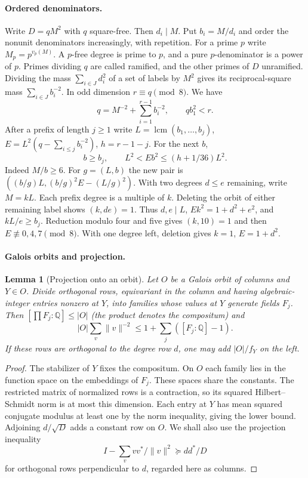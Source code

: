 \documentclass[11pt]{amsart}
\numberwithin{equation}{section}
\newtheorem{lemma}[theorem]{Lemma}
\theoremstyle{definition}
\theoremstyle{plain}
\DeclareMathOperator{\lcm}{lcm}
\newcommand{\QQ}{\mathbb Q}
\begin{document}
\paragraph{Ordered denominators.}
Write $D=qM^2$ with $q$ square-free. Then $d_i\mid M$. Put
$b_i=M/d_i$ and order the nonunit denominators increasingly, with
repetition. For a prime $p$ write $M_p=p^{v_p(M)}$. A $p$-free
degree is prime to $p$, and a pure $p$-denominator is a power of $p$.
Primes dividing $q$ are called ramified, and the other primes of $D$
unramified. Dividing the mass $\sum_{i\in J}d_i^2$ of a set of
labels by $M^2$ gives its reciprocal-square mass $\sum_{i\in J}b_i^{-2}$.
In odd dimension $r\equiv q\pmod8$. We have
\begin{equation}
 q=M^{-2}+\sum_{i=1}^{r-1}b_i^{-2},\qquad qb_1^2<r .
\end{equation}
After a prefix of length $j\ge1$ write $L=\lcm(b_1,\ldots,b_j)$,
$E=L^2(q-\sum_{i\le j}b_i^{-2})$, $h=r-1-j$. For the next $b$,
\begin{equation}\label{eq:interval}
 b\ge b_j,\qquad L^2<Eb^2\le(h+1/36)L^2 .
\end{equation}
Indeed $M/b\ge6$. For $g=(L,b)$ the new pair is
$((b/g)L,(b/g)^2 E-(L/g)^2)$. With two degrees $d\le e$ remaining,
write $M=kL$. Each prefix degree is a multiple of $k$. Deleting
the orbit of either remaining label shows $(k,de)=1$. Thus
$d,e\mid L$, $Ek^2=1+d^2+e^2$, and $kL/e\ge b_j$.
Reduction modulo four and five gives $(k,10)=1$ and then
$E\not\equiv0,4,7\pmod8$. With one degree left, deletion gives
$k=1$, $E=1+d^2$.

\paragraph{Galois orbits and projection.}
\begin{lemma}[Projection onto an orbit]\label{result:field-rank}
Let $O$ be a Galois orbit of columns and $Y\in O$. Divide orthogonal
rows, equivariant in the column and having algebraic-integer entries
nonzero at $Y$, into families whose values at $Y$ generate fields $F_j$.
Then $[\prod F_j:\QQ]\le |O|$ (the product denotes the compositum) and
\[
 |O|\sum_v\|v\|^{-2}\le1+\sum_j([F_j:\QQ]-1).
\]
If these rows are orthogonal to the degree row $d$, one may add
$|O|/f_Y$ on the left.
\end{lemma}
\begin{proof}
The stabilizer of $Y$ fixes the compositum. On $O$ each family lies
in the function space on the embeddings of $F_j$. These spaces share
the constants. The restricted matrix of normalized rows is a contraction,
so its squared Hilbert--Schmidt norm is at most this dimension.
Each entry at $Y$ has mean squared conjugate modulus at least one
by the norm inequality, giving the lower bound. Adjoining $d/\sqrt D$
adds a constant row on $O$. We shall also use the projection inequality
\begin{equation}
 I-\sum_v vv^*/\|v\|^2\succeq dd^*/D
\end{equation}
for orthogonal rows perpendicular to $d$, regarded here as columns.
\end{proof}
\end{document}
